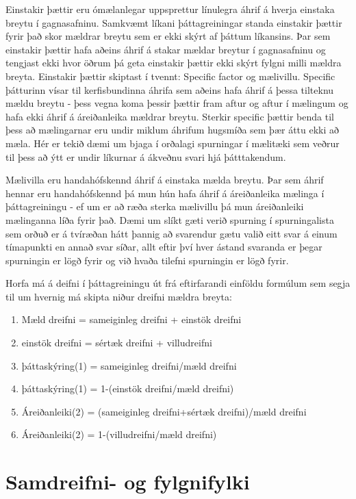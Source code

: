 \documentclass[]{book}
\providecommand{\tightlist}{%
  \setlength{\itemsep}{0pt}\setlength{\parskip}{0pt}}
\begin{document}
Einstakir þættir eru ómælanlegar uppsprettur línulegra áhrif á hverja einstaka breytu í gagnasafninu. Samkvæmt líkani þáttagreiningar standa einstakir þættir fyrir það skor mældrar breytu sem er ekki skýrt af þáttum líkansins. Þar sem einstakir þættir hafa aðeins áhrif á stakar mældar breytur í gagnasafninu og tengjast ekki hvor öðrum þá geta einstakir þættir ekki skýrt fylgni milli mældra breyta. Einstakir þættir skiptast í tvennt: Specific factor og mælivillu. Specific þátturinn vísar til kerfisbundinna áhrifa sem aðeins hafa áhrif á þessa tilteknu mældu breytu - þess vegna koma þessir þættir fram aftur og aftur í mælingum og hafa ekki áhrif á áreiðanleika mældrar breytu. Sterkir specific þættir benda til þess að mælingarnar eru undir miklum áhrifum hugsmíða sem þær áttu ekki að mæla. Hér er tekið dæmi um bjaga í orðalagi spurningar í mælitæki sem veðrur til þess að ýtt er undir líkurnar á ákveðnu svari hjá þátttakendum.

Mælivilla eru handahófskennd áhrif á einstaka mælda breytu. Þar sem áhrif hennar eru handahófskennd þá mun hún hafa áhrif á áreiðanleika mælinga í þáttagreiningu - ef um er að ræða sterka mælivillu þá mun áreiðanleiki mælinganna líða fyrir það. Dæmi um slíkt gæti verið spurning í spurningalista sem orðuð er á tvíræðan hátt þannig að svarendur gætu valið eitt svar á einum tímapunkti en annað svar síðar, allt eftir því hver ástand svaranda er þegar spurningin er lögð fyrir og við hvaða tilefni spurningin er lögð fyrir.

Horfa má á deifni í þáttagreiningu út frá eftirfarandi einföldu formúlum sem segja til um hvernig má skipta niður dreifni mældra breyta:

\begin{enumerate}
\def\labelenumi{\arabic{enumi})}
\tightlist
\item
  Mæld dreifni = sameiginleg dreifni + einstök dreifni
\item
  einstök dreifni = sértæk dreifni + villudreifni
\item
  þáttaskýring(1) = sameiginleg dreifni/mæld dreifni
\item
  þáttaskýring(1) = 1-(einstök dreifni/mæld dreifni)
\item
  Áreiðanleiki(2) = (sameiginleg dreifni+sértæk dreifni)/mæld dreifni
\item
  Áreiðanleiki(2) = 1-(villudreifni/mæld dreifni)
\end{enumerate}

\hypertarget{samdreifni--og-fylgnifylki}{%
\section{Samdreifni- og fylgnifylki}\label{samdreifni--og-fylgnifylki}}
\end{document}
